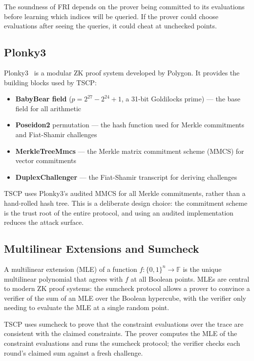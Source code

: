 \documentclass[11pt,a4paper]{article}
\begin{document}
The soundness of FRI depends on the prover being committed to its evaluations before learning which indices will be queried. If the prover could choose evaluations after seeing the queries, it could cheat at unchecked points.

\subsection{Plonky3}

Plonky3~\cite{plonky3} is a modular ZK proof system developed by Polygon. It provides the building blocks used by TSCP:

\begin{itemize}
\item \textbf{BabyBear field} ($p = 2^{27} - 2^{24} + 1$, a 31-bit Goldilocks prime) --- the base field for all arithmetic
\item \textbf{Poseidon2} permutation --- the hash function used for Merkle commitments and Fiat-Shamir challenges
\item \textbf{MerkleTreeMmcs} --- the Merkle matrix commitment scheme (MMCS) for vector commitments
\item \textbf{DuplexChallenger} --- the Fiat-Shamir transcript for deriving challenges
\end{itemize}

TSCP uses Plonky3's audited MMCS for all Merkle commitments, rather than a hand-rolled hash tree. This is a deliberate design choice: the commitment scheme is the trust root of the entire protocol, and using an audited implementation reduces the attack surface.

\subsection{Multilinear Extensions and Sumcheck}

A multilinear extension (MLE) of a function $f: \{0,1\}^n \to \mathbb{F}$ is the unique multilinear polynomial that agrees with $f$ at all Boolean points. MLEs are central to modern ZK proof systems: the sumcheck protocol allows a prover to convince a verifier of the sum of an MLE over the Boolean hypercube, with the verifier only needing to evaluate the MLE at a single random point.

TSCP uses sumcheck to prove that the constraint evaluations over the trace are consistent with the claimed constraints. The prover computes the MLE of the constraint evaluations and runs the sumcheck protocol; the verifier checks each round's claimed sum against a fresh challenge.
\end{document}
